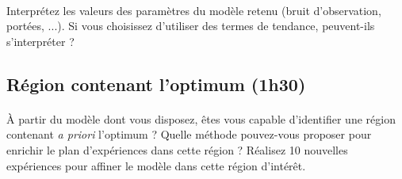\documentclass[a4paper,10pt]{article}
\begin{document}
\paragraph{}
Interprétez les valeurs des paramètres du modèle retenu (bruit d'observation, portées, ...). Si vous choisissez d'utiliser des termes de tendance, peuvent-ils s'interpréter ?

\subsection*{Région contenant l'optimum (1h30)}
\paragraph{}
À partir du modèle dont vous disposez, êtes vous capable d'identifier une région contenant \emph{a priori} l'optimum ? Quelle méthode pouvez-vous proposer pour enrichir le plan d'expériences dans cette région ? Réalisez 10 nouvelles expériences pour affiner le modèle dans cette région d'intérêt.
\end{document}
